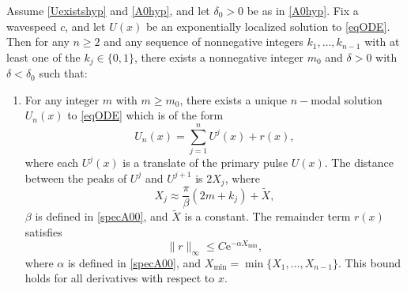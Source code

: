 \documentclass[review,onefignum,onetabnum]{siamart171218}
\newcommand{\rme}{\mathrm{e}}
\begin{document}
\begin{theorem}\label{multiexist}
Assume \cref{Uexistshyp} and \cref{A0hyp}, and let $\delta_0 > 0$ be as in \cref{A0hyp}.
Fix a wavespeed $c$, and let $U(x)$ be an exponentially localized solution to \cref{eqODE}. Then for any $n \geq 2$ and any sequence of nonnegative integers $k_1, \dots, k_{n-1}$ with at least one of the $k_j \in \{0, 1 \}$, there exists a nonnegative integer $m_0$ and $\delta > 0$ with $\delta < \delta_0$ such that:
\begin{enumerate}%
	\item For any integer $m$ with $m \geq m_0$, there exists a unique $n-$modal solution $U_n(x)$ to \cref{eqODE} which is of the form
	\begin{equation}\label{qn}
	U_n(x) = \sum_{j = 1}^{n} U^j(x) + r(x),
	\end{equation}
	where each $U^j(x)$ is a translate of the primary pulse $U(x)$. The distance between the peaks of $U^j$ and $U^{j+1}$ is $2 X_j$, where
	\begin{equation*}
	X_j \approx \frac{\pi}{\beta}(2 m + k_j) + \tilde{X},
	\end{equation*}
	$\beta$ is defined in \cref{specA00}, and $\tilde{X}$ is a constant. The remainder term $r(x)$ satisfies
	\begin{equation}\label{rbound}
	\|r\|_\infty \leq C \rme^{-\alpha X_{\mathrm{min}}},
	\end{equation}
	where $\alpha$ is defined in \cref{specA00}, and $X_{\mathrm{min}} = \min\{X_1, \dots, X_{n-1}\}$. This bound holds for all derivatives with respect to $x$.


\end{enumerate}
\end{theorem}
\end{document}
